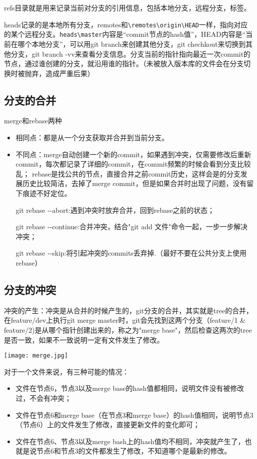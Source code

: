 \documentclass[cn,hazy,blue,14pt,通用]{elegantnote}
\begin{document}
        refs目录就是用来记录当前对分支的引用信息，包括本地分支，远程分支，标签。

        heads记录的是本地所有分支，remotes和\lstinline{\remotes\origin\HEAD}一样，指向对应的某个远程分支。\lstinline{heads\master}内容是“commit节点的hash值”，HEAD内容是“当前在哪个本地分支”，可以用git branch来创建其他分支，git chechkout来切换到其他分支，git branch -vv来查看分支信息。分支当前的指针指向最近一次commit的节点，通过谁创建的分支，就沿用谁的指针。（未被放入版本库的文件会在分支切换时被抛弃，造成严重后果）
    \subsection{分支的合并}
        merge和rebase两种 
        \begin{itemize}
            \item 相同点：都是从一个分支获取并合并到当前分支。
            \item 不同点：merge自动创建一个新的commit，如果遇到冲突，仅需要修改后重新commit，每次都记录了详细的commit，在commit频繁的时候会看到分支比较乱；
                         rebase是找公共的节点，直接合并之前commit历史，这样会是的分支发展历史比较简洁，去掉了merge commit，但是如果合并时出现了问题，没有留下痕迹不好定位。

                        git rebase -\space-abort:遇到冲突时放弃合并，回到rebase之前的状态；

                        git rebase -\space-continue:合并冲突，结合"git add 文件"命令一起，一步一步解决冲突；

                        git rebase -\space-skip:将引起冲突的commits丢弃掉.（最好不要在公共分支上使用rebase）
        \end{itemize}
            
            
    \subsection{分支的冲突}
        冲突的产生：冲突是从合并的时候产生的，git分支的合并，其实就是tree的合并，在feature/dev上执行git merge master时，git会先找到这两个分支（feature/1 \& feature/2)是从哪个指针创建出来的，称之为"merge base"，然后检查这两次的tree是否一致，如果不一致说明一定有文件发生了修改。

        \texttt{[image: merge.jpg]}

        对于一个文件来说，有三种可能的情况：
        \begin{itemize}
            \item 文件在节点6，节点3以及merge base的hash值都相同，说明文件没有被修改过，不会有冲突；
            \item 文件在节点6和merge base（在节点3和merge base）的hash值相同，说明节点3（节点6）上的文件发生了修改，直接更新文件的变化即可；
            \item 文件在节点6、节点3以及merge bash上的hash值均不相同，冲突就产生了，也就是说节点6和节点3的文件都发生了修改，不知道哪个是最新的修改。
        \end{itemize}
\end{document}
